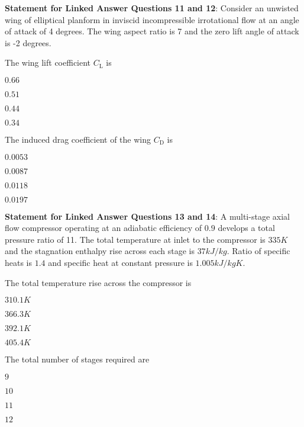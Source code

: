 \item[] \textbf{Statement for Linked Answer Questions 11 and 12}: Consider an unwisted wing of elliptical planform in inviscid incompressible irrotational flow at an angle of attack of 4 degrees. The wing aspect ratio is 7 and the zero lift angle of attack is -2 degrees.

\item The wing lift coefficient $C_{\text{L}}$ is 
\begin{enumerate}
\begin{multicols}{4}
    \item $ 0.66 $
    \item $ 0.51$
    \item $ 0.44$
    \item $ 0.34$
    \end{multicols}
\end{enumerate}
\item The induced drag coefficient of the wing $C_{\text{D}}$ is
\begin{enumerate}
\begin{multicols}{4}
    \item $ 0.0053 $
    \item $ 0.0087 $
    \item $ 0.0118 $
    \item $ 0.0197$
    \end{multicols}
\end{enumerate}

\item[] \textbf{Statement for Linked Answer Questions 13 and 14}: A multi-stage axial flow compressor operating at an adiabatic efficiency of $0.9$ develops a total pressure ratio of 11. The total temperature at inlet to the compressor is $335K$ and the stagnation enthalpy rise across each stage is $37 kJ/kg$. Ratio of specific heats is $1.4$ and specific heat at constant pressure is $1.005 kJ/kg K$.
\item The total temperature rise across the compressor is
\begin{enumerate}
\begin{multicols}{4}
    \item $ 310.1K $
    \item $ 366.3K $
    \item $ 392.1K $
    \item $ 405.4K $
    \end{multicols}
\end{enumerate}

\item The total number of stages required are
\begin{enumerate}
\begin{multicols}{4}
    \item $ 9 $
    \item $ 10 $
    \item $ 11 $
    \item $ 12 $
    \end{multicols}
\end{enumerate}

